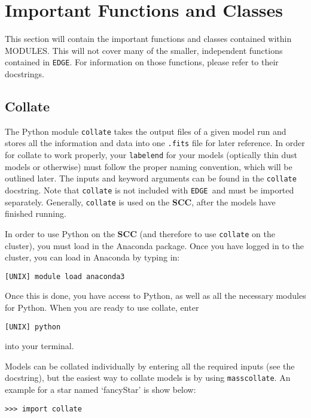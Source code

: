 \documentclass{article}
\newcommand{\edge}{\texttt{EDGE }}
\begin{document}
 
\section{Important Functions and Classes} \label{functions}

This section will contain the important functions and classes contained within MODULES. This will not cover many of the smaller, independent functions contained in \texttt{EDGE}. For information on those functions, please refer to their docstrings. 
 
\subsection{Collate}
 
The Python module \texttt{collate} takes the output files of a given model run and stores all the information and data into one \texttt{.fits} file for later reference. In order for collate to work properly, your \texttt{labelend} for your models (optically thin dust models or otherwise) must follow the proper naming convention, which will be outlined later. The inputs and keyword arguments can be found in the \texttt{collate} docstring. Note that \texttt{collate} is not included with \edge and must be imported separately. 
Generally, \texttt{collate} is used on the \textbf{SCC}, after the models have finished running. 

In order to use Python on the \textbf{SCC} (and therefore to use \texttt{collate} on the cluster), you must load in the Anaconda package. Once you have logged in to the cluster, you can load in Anaconda by typing in: 

\vspace{2mm}
\texttt{[UNIX] module load anaconda3}
\vspace{2mm}

\noindent Once this is done, you have access to Python, as well as all the necessary modules for Python. When you are ready to use collate, enter 

\vspace{2mm}
\texttt{[UNIX] python} 
\vspace{2mm}

\noindent into your terminal.

Models can be collated individually by entering all the required inputs (see the docstring), but the easiest way to collate models is by using \texttt{masscollate}. An example for a star named `fancyStar' is show below:

\vspace{2mm}
\texttt{>>> import collate}
\end{document}
